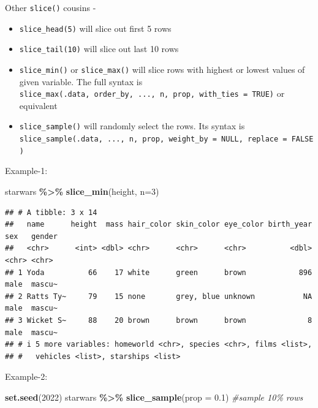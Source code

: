 \documentclass[
]{book}
\newenvironment{Shaded}{\begin{snugshade}}{\end{snugshade}}
\newcommand{\AttributeTok}[1]{\textcolor[rgb]{0.13,0.29,0.53}{#1}}
\newcommand{\CommentTok}[1]{\textcolor[rgb]{0.56,0.35,0.01}{\textit{#1}}}
\newcommand{\DecValTok}[1]{\textcolor[rgb]{0.00,0.00,0.81}{#1}}
\newcommand{\FloatTok}[1]{\textcolor[rgb]{0.00,0.00,0.81}{#1}}
\newcommand{\FunctionTok}[1]{\textcolor[rgb]{0.13,0.29,0.53}{\textbf{#1}}}
\newcommand{\NormalTok}[1]{#1}
\newcommand{\SpecialCharTok}[1]{\textcolor[rgb]{0.81,0.36,0.00}{\textbf{#1}}}
\providecommand{\tightlist}{%
  \setlength{\itemsep}{0pt}\setlength{\parskip}{0pt}}
\begin{document}
Other \texttt{slice()} cousins -

\begin{itemize}
\tightlist
\item
  \texttt{slice\_head(5)} will slice out first 5 rows
\item
  \texttt{slice\_tail(10)} will slice out last 10 rows
\item
  \texttt{slice\_min()} or \texttt{slice\_max()} will slice rows with highest or lowest values of given variable. The full syntax is \texttt{slice\_max(.data,\ order\_by,\ ...,\ n,\ prop,\ with\_ties\ =\ TRUE)} or equivalent
\item
  \texttt{slice\_sample()} will randomly select the rows. Its syntax is \texttt{slice\_sample(.data,\ ...,\ n,\ prop,\ weight\_by\ =\ NULL,\ replace\ =\ FALSE)}
\end{itemize}

Example-1:

\begin{Shaded}
\begin{Highlighting}[]
\NormalTok{starwars }\SpecialCharTok{\%\textgreater{}\%} 
  \FunctionTok{slice\_min}\NormalTok{(height, }\AttributeTok{n=}\DecValTok{3}\NormalTok{)}
\end{Highlighting}
\end{Shaded}

\begin{verbatim}
## # A tibble: 3 x 14
##   name      height  mass hair_color skin_color eye_color birth_year sex   gender
##   <chr>      <int> <dbl> <chr>      <chr>      <chr>          <dbl> <chr> <chr> 
## 1 Yoda          66    17 white      green      brown            896 male  mascu~
## 2 Ratts Ty~     79    15 none       grey, blue unknown           NA male  mascu~
## 3 Wicket S~     88    20 brown      brown      brown              8 male  mascu~
## # i 5 more variables: homeworld <chr>, species <chr>, films <list>,
## #   vehicles <list>, starships <list>
\end{verbatim}

Example-2:

\begin{Shaded}
\begin{Highlighting}[]
\FunctionTok{set.seed}\NormalTok{(}\DecValTok{2022}\NormalTok{)}
\NormalTok{starwars }\SpecialCharTok{\%\textgreater{}\%} 
  \FunctionTok{slice\_sample}\NormalTok{(}\AttributeTok{prop =} \FloatTok{0.1}\NormalTok{) }\CommentTok{\#sample 10\% rows}
\end{Highlighting}
\end{Shaded}
\end{document}
